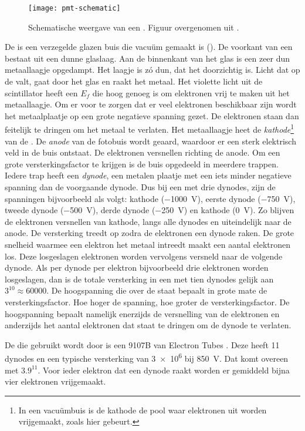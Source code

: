 \begin{figure}
\centering
\texttt{[image: pmt-schematic]}
\caption{Schematische weergave van een \pmt.  Figuur overgenomen uit
\cite{hamamatsu}.}
\label{fig:pmt}
\end{figure}

De \pmt is een verzegelde glazen buis die vacuüm gemaakt
is ().  De voorkant van een \pmt bestaat uit een dunne
glaslaag.  Aan de binnenkant van het glas is een zeer dun metaallaagje
opgedampt.  Het laagje is zó dun, dat het doorzichtig is.  Licht dat op de
\pmt valt, gaat door het glas en raakt het metaal.  Het violette licht uit
de scintillator heeft een $E_f$ die hoog genoeg is om elektronen vrij te
maken uit het metaallaagje.  Om er voor te zorgen dat er veel elektronen
beschikbaar zijn wordt het metaalplaatje op een grote negatieve spanning
gezet.  De elektronen staan dan feitelijk te dringen om het metaal te
verlaten.  Het metaallaagje heet de \emph{kathode}\footnote{In een
vacuümbuis is de kathode de pool waar elektronen uit worden vrijgemaakt,
zoals hier gebeurt.} van de \pmt.  De \emph{anode} van de fotobuis wordt
geaard, waardoor er een sterk elektrisch veld in de buis ontstaat.  De
elektronen versnellen richting de anode.  Om een grote versterkingsfactor
te krijgen is de buis opgedeeld in meerdere trappen.  Iedere trap heeft
een \emph{dynode}, een metalen plaatje met een iets minder negatieve
spanning dan de voorgaande dynode.  Dus bij een \pmt met drie dynodes,
zijn de spanningen bijvoorbeeld als volgt: kathode (\SI{-1000}{\volt}),
eerste dynode (\SI{-750}{\volt}), tweede dynode (\SI{-500}{\volt}), derde
dynode (\SI{-250}{\volt}) en kathode (\SI{0}{\volt}).  Zo blijven de
elektronen versnellen van kathode, langs alle dynodes en uiteindelijk naar
de anode.  De versterking treedt op zodra de elektronen een dynode raken.
De grote snelheid waarmee een elektron het metaal intreedt maakt een
aantal elektronen los.  Deze losgeslagen elektronen worden vervolgens
versneld naar de volgende dynode.  Als per dynode per elektron
bijvoorbeeld drie elektronen worden losgeslagen, dan is de totale
versterking in een \pmt met tien dynodes gelijk aan $3^{10} \approx
\num{60000}$.  De hoogspanning die over de \pmt staat bepaalt in grote
mate de versterkingsfactor.  Hoe hoger de spanning, hoe groter de
versterkingsfactor.  De hoogspanning bepaalt namelijk enerzijds de
versnelling van de elektronen en anderzijds het aantal elektronen dat
staat te dringen om de dynode te verlaten.

De \pmt die gebruikt wordt door \hisparc is een 9107B van Electron
Tubes \cite{9107B}.  Deze heeft 11 dynodes en een typische versterking van
\num{3e6} bij \SI{850}{\volt}.  Dat komt overeen met $\num{3.9}^{11}$.  Voor
ieder elektron dat een dynode raakt worden er gemiddeld bijna vier
elektronen vrijgemaakt.


